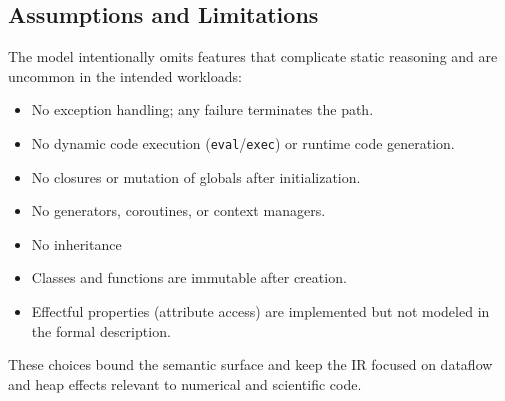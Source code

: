 \subsection{Assumptions and Limitations}

The model intentionally omits features that complicate static reasoning and are uncommon in the intended workloads:
\begin{itemize}
\item No exception handling; any failure terminates the path.
\item No dynamic code execution (\texttt{eval}/\texttt{exec}) or runtime code generation.
\item No closures or mutation of globals after initialization.
\item No generators, coroutines, or context managers.
\item No inheritance
\item Classes and functions are immutable after creation.
\item Effectful properties (attribute access) are implemented but not modeled in the formal description.
\end{itemize}
These choices bound the semantic surface and keep the IR focused on dataflow and heap effects relevant to numerical and scientific code.

\clearpage
